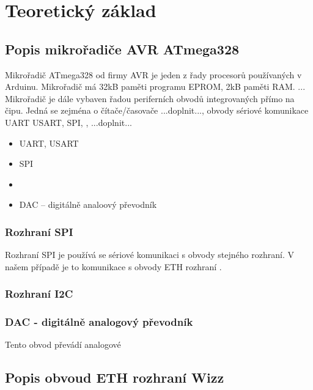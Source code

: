 \chapter{Teoretický základ}

\section{Popis mikrořadiče AVR ATmega328}

Mikrořadič ATmega328 od firmy AVR je jeden z řady procesorů používaných v Arduinu.  Mikrořadič má 32kB paměti programu EPROM, 2kB paměti RAM.
...
Mikrořadič je dále vybaven řadou periferních obvodů integrovaných přímo na čipu.  Jedná se zejména o čítače/časovače ...doplnit..., obvody sériové komunikace UART USART, SPI, \IIC, ...doplnit...


\IIC

\begin{itemize}
\item UART, USART
\item SPI
\item \IIC
\item DAC -- digitálně analoový převodník
\end{itemize}

\subsection{Rozhraní SPI}

Rozhraní SPI je  používá se sériové komunikaci s obvody stejného rozhraní.  V našem případě je to komunikace s obvody ETH rozhraní .

\subsection{Rozhraní I2C}

\subsection{DAC - digitálně analogový převodník}

Tento obvod převádí analogové

\section{Popis obvoud ETH rozhraní Wizz}

